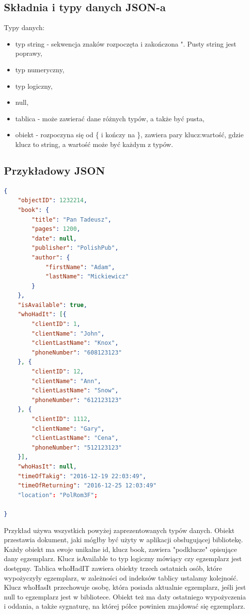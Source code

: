 \documentclass[a4paper,12pt,table]{article}
\begin{document}
\subsection{Składnia i typy danych JSON-a}
Typy danych:\begin{itemize}
\item typ string - sekwencja znaków rozpoczęta i zakończona ". Pusty string jest poprawy,
\item typ numeryczny,
\item typ logiczny,
\item null,
\item tablica - może zawierać dane różnych typów, a także być pusta,
\item obiekt - rozpoczyna się od \{ i kończy na \}, zawiera pary klucz:wartość, gdzie klucz to string, a wartość może być każdym z typów. 
\end{itemize}
\setlength{\parskip}{2\bigskipamount plus \smallskipamount minus \smallskipamount}
\newpage
\subsection{Przykładowy JSON}
\begin{lstlisting}[language=json]
{
	"objectID": 1232214,
	"book": {
		"title": "Pan Tadeusz",
		"pages": 1200,
		"date": null,
		"publisher": "PolishPub",
		"author": {
			"firstName": "Adam",
			"lastName": "Mickiewicz"
		}
	},
	"isAvailable": true,
	"whoHadIt": [{
		"clientID": 1,
		"clientName": "John",
		"clientLastName": "Knox",
		"phoneNumber": "608123123"
	}, {
		"clientID": 12,
		"clientName": "Ann",
		"clientLastName": "Snow",
		"phoneNumber": "612123123"
	}, {
		"clientID": 1112,
		"clientName": "Gary",
		"clientLastName": "Cena",
		"phoneNumber": "512123123"
	}],
	"whoHasIt": null,
	"timeOfTakig": "2016-12-19 22:03:49",
	"timeOfReturning": "2016-12-25 12:03:49"
	"location": "PolRom3F";

}
\end{lstlisting}
\vspace{0.5cm}
Przykład używa wszystkich powyżej zaprezentowanych typów danych. Obiekt przestawia dokument, jaki mógłby być użyty w aplikacji obsługującej bibliotekę. Każdy obiekt ma swoje unikalne id, klucz book, zawiera "podklucze" opisujące dany egzemplarz. Klucz isAvailable to typ logiczny mówiący czy egzemplarz jest dostępny. Tablica whoHadIT zawiera obiekty trzech ostatnich osób, które wypożyczyły egzemplarz, w zależności od indeksów tablicy ustalamy kolejność. Klucz whoHasIt przechowuje osobę, która posiada aktualnie egzemplarz, jeśli jest null to egzemplarz jest w bibliotece. Obiekt też ma daty ostatniego wypożyczenia i oddania, a także sygnaturę, na której półce powinien znajdować się egzemplarz.\newpage
\end{document}
